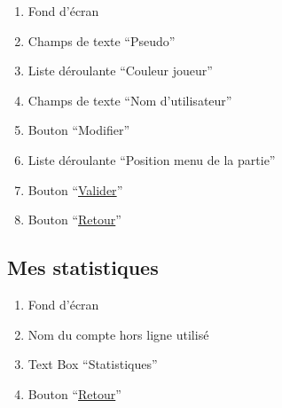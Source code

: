 \documentclass{report}
\begin{document}
		
		
		\begin{enumerate}
		  \item Fond d'écran
		  \item Champs de texte ``Pseudo''
		  \item Liste déroulante ``Couleur joueur''
		  \item Champs de texte ``Nom d'utilisateur''
		  \item Bouton ``Modifier''
		  \item Liste déroulante ``Position menu de la partie''
		  \item Bouton ``\hyperlink{Options}{Valider}''
		  \item Bouton ``\hyperlink{Options}{Retour}''
		\end{enumerate}
	
\newpage

	\subsection{Mes statistiques}
	
		
		
		\hypertarget{Statistiques}{}
		\label{Statistiques}
		
		\begin{enumerate}
		  \item Fond d'écran
		  \item Nom du compte hors ligne utilisé
		  \item Text Box ``Statistiques''
		  \item Bouton ``\hyperlink{Acceuil}{Retour}''
		\end{enumerate}
	
\newpage
	
\end{document}
